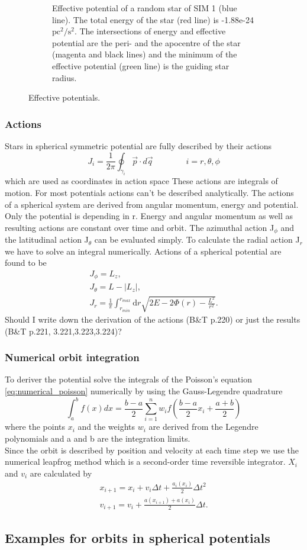 \begin{figure}[htbp]
\begin{subfigure}{0.475\textwidth}
	\caption{Effective potential of a random star of SIM 1 (blue line). The total energy of the star (red line) is -1.88e-24 \(\mathrm{pc}^2/\mathrm{s}^2\). The intersections of energy and effective potential are the peri- and the apocentre of the star (magenta and black lines) and the minimum of the effective potential (green line) is the guiding star radius.}
	\label{pot_eff_theory_part}
	\end{subfigure}
\caption{Effective potentials.}
\label{fig:pot_eff_theory}
\end{figure}
\subsubsection{Actions}
Stars in spherical symmetric potential are fully described by their actions \begin{equation}
J_i=\frac{1}{2\pi}\oint_{\gamma_i}\vec{p}\cdot d\vec{q} \qquad\qquad i=r,\theta,\phi
\end{equation} which are used as coordinates in action space
These actions are integrals of motion. For most potentials actions can't be described analytically. The actions of a spherical system are derived from angular momentum, energy and potential. Only the potential is depending in r. Energy and angular momentum as well as resulting actions are constant over time and orbit. The azimuthal action J\(_\phi\) and the latitudinal action J\(_\theta\) can be evaluated simply. To calculate the radial action J\(_r\) we have to solve an integral numerically. Actions of a spherical potential are found to be \begin{align}
J_\phi=L_z, \\ J_\theta=L-|L_z|, \\ J_r=\frac{1}{\pi} \int_{r_{min}}^{r_{max}} \mathrm{d}r \sqrt{2E-2\Phi(r)-\frac{L^2}{r^2}}.
\end{align}\color{red} Should I write down the derivation of the actions (B\&T p.220) or just the results (B\&T p.221, 3.221,3.223,3.224)?\color{black} \\ 
\subsubsection{Numerical orbit integration}
To deriver the potential solve the integrals of the Poisson's equation \eqref{eq:numerical_poisson} numerically by using the Gauss-Legendre quadrature \[\int_a^b f(x)dx = \frac{b-a}{2}\sum_{i=1}^n w_i f\left(\frac{b-a}{2}x_i+\frac{a+b}{2}\right)\] where the points \(x_i\) and the weights \(w_i\) are derived from the Legendre polynomials and a and b are the integration limits.\\ Since the orbit is described by position and velocity at each time step we use the numerical leapfrog method which is a second-order time reversible integrator. \(X_i\) and \(v_i\) are calculated by 
\begin{align*}
x_{i+1}=x_i+v_i\Delta t+\frac{a_i(x_i)}{2}\Delta t^2 \\
v_{i+1}=v_i+\frac{a(x_{i+1})+a(x_i)}{2}\Delta t.
\end{align*}
\subsection{Examples for orbits in spherical potentials}

